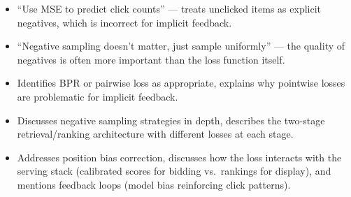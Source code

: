 \begin{interviewq}
\redflags
\begin{itemize}
    \item ``Use MSE to predict click counts'' --- treats unclicked items as explicit negatives, which is incorrect for implicit feedback.
    \item ``Negative sampling doesn't matter, just sample uniformly'' --- the quality of negatives is often more important than the loss function itself.
\end{itemize}


\goodgreat
\begin{itemize}
    \item {} Identifies BPR or pairwise loss as appropriate, explains why pointwise losses are problematic for implicit feedback.
    \item {} Discusses negative sampling strategies in depth, describes the two-stage retrieval/ranking architecture with different losses at each stage.
    \item {} Addresses position bias correction, discusses how the loss interacts with the serving stack (calibrated scores for bidding vs.\ rankings for display), and mentions feedback loops (model bias reinforcing click patterns).
\end{itemize}

\end{interviewq}

